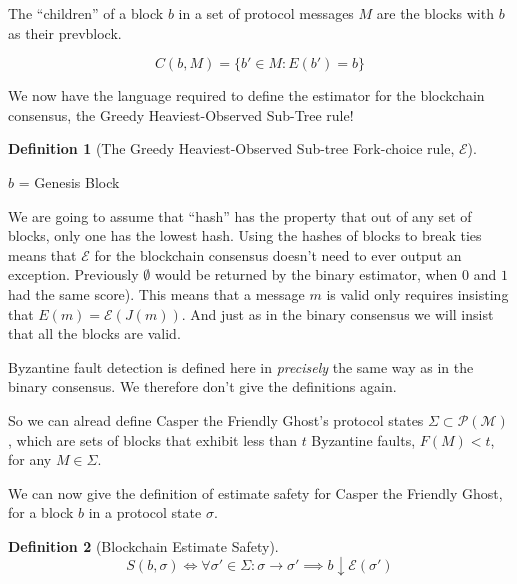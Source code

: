\documentclass{article}
\theoremstyle{definition}
\newtheorem{defn}{Definition}[section]
\begin{document}
The ``children'' of a block $b$ in a set of protocol messages $M$ are the blocks with $b$ as their prevblock.

$$
C(b,M) = \{b' \in M : E(b') = b\}
$$

We now have the language required to define the estimator for the blockchain consensus, the Greedy Heaviest-Observed Sub-Tree rule!
\begin{defn}[The Greedy Heaviest-Observed Sub-tree Fork-choice rule, $\mathcal{E}$]
\end{defn}

\begin{algorithm}[H]
 $b$ = Genesis Block


\caption{The Greedy Heaviest-Observed Sub-tree Fork-choice rule, $\mathcal{E}$}
\end{algorithm}

We are going to assume that ``hash'' has the property that out of any set of blocks, only one has the lowest hash. Using the hashes of blocks to break ties means that $\mathcal{E}$ for the blockchain consensus doesn't need to ever output an exception. Previously $\emptyset$ would be returned by the binary estimator, when $0$ and $1$ had the same score). This means that a message $m$ is valid only requires insisting that $E(m) = \mathcal{E}(J(m))$. And just as in the binary consensus we will insist that all the blocks are valid.

Byzantine fault detection is defined here in \emph{precisely} the same way as in the binary consensus. We therefore don't give the definitions again. 

So we can alread define Casper the Friendly Ghost's protocol states $\Sigma \subset \mathcal{P}(\mathcal{M})$, which are sets of blocks that exhibit less than $t$ Byzantine faults, $F(M) < t$, for any $M \in \Sigma$.

We can now give the definition of estimate safety for Casper the Friendly Ghost, for a block $b$ in a protocol state $\sigma$.

\begin{defn}[Blockchain Estimate Safety]
$$
S(b, \sigma) \iff \forall \sigma' \in \Sigma: \sigma \to \sigma' \implies b \downarrow \mathcal{E}(\sigma')
$$
\end{defn}
\end{document}
